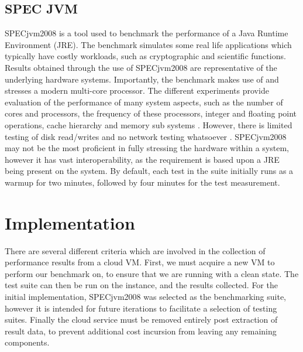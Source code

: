\documentclass{entcs} \usepackage{entcsmacro}
\begin{document}
\subsection{SPEC JVM}

SPECjvm2008 is a tool used to benchmark the performance of a Java Runtime Environment (JRE). The benchmark simulates some real life applications which typically have costly workloads, such as cryptographic and scientific functions. Results obtained through the use of SPECjvm2008 are representative of the underlying hardware systems. Importantly, the benchmark makes use of and stresses a modern multi-core processor. The different experiments provide evaluation of the performance of many system aspects, such as the number of cores and processors, the frequency of these processors, integer and floating point operations, cache hierarchy and memory sub systems \cite{shiv2009specjvm2008}. However, there is limited testing of disk read/writes and no network testing whatsoever \cite{specjvm}. SPECjvm2008 may not be the most proficient in fully stressing the hardware within a system, however it has vast interoperability, as the requirement is based upon a JRE being present on the system. By default, each test in the suite initially runs as a warmup for two minutes, followed by four minutes for the test measurement.


\section{Implementation}\label{sec:implementation}

There are several different criteria which are involved in the collection of performance results from a cloud VM. First, we must acquire a new VM to perform our benchmark on, to ensure that we are running with a clean state. The test suite can then be run on the instance, and the results collected. For the initial implementation, SPECjvm2008 was selected as the benchmarking suite, however it is intended for future iterations to facilitate a selection of testing suites. Finally the cloud service must be removed entirely post extraction of result data, to prevent additional cost incursion from leaving any remaining components.
\end{document}
